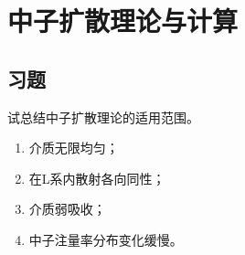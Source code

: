 \chapter{中子扩散理论与计算}
\section*{习题}

\begin{exercise}
    试总结中子扩散理论的适用范围。
    \begin{solution}
        \begin{enumerate}[(1)]
            \item 介质无限均匀；
            \item 在L系内散射各向同性；
            \item 介质弱吸收；
            \item 中子注量率分布变化缓慢。
        \end{enumerate}
    \end{solution}
\end{exercise}

